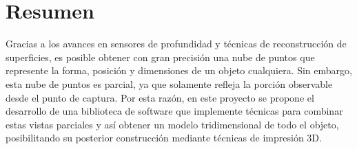 \chapter{Resumen}
Gracias a los avances en sensores de profundidad y técnicas de reconstrucción de superficies,
es posible obtener con gran precisión una nube de puntos que represente
la forma, posición y dimensiones de un objeto cualquiera.
Sin embargo, esta nube de puntos es parcial, ya que solamente refleja
la porción observable desde el punto de captura.
Por esta razón, en este proyecto se propone el desarrollo de una biblioteca de software
que implemente técnicas para combinar estas vistas parciales
y así obtener un modelo tridimensional de todo el objeto,
posibilitando su posterior construcción mediante técnicas de impresión 3D.

